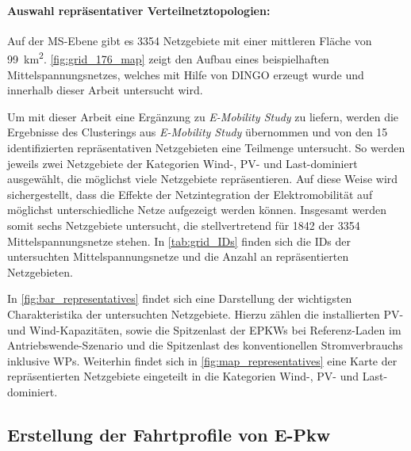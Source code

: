 \paragraph{Auswahl repräsentativer Verteilnetztopologien:}

Auf der \gls{MS}-Ebene gibt es \num{3354} Netzgebiete mit einer mittleren Fläche von \SI{99}{\km\squared}.
\autoref{fig:grid_176_map} zeigt den Aufbau eines beispielhaften Mittelspannungsnetzes, welches mit Hilfe von \gls{DINGO} erzeugt wurde und innerhalb dieser Arbeit untersucht wird.



Um mit dieser Arbeit eine Ergänzung zu \textit{E-Mobility Study} \cite{Schachler} zu liefern, werden die Ergebnisse des Clusterings aus \textit{E-Mobility Study} \cite{Schachler} übernommen und von den \num{15} identifizierten repräsentativen Netzgebieten eine Teilmenge untersucht.
So werden jeweils zwei Netzgebiete der Kategorien Wind-, \gls{PV}- und Last-dominiert ausgewählt, die möglichst viele Netzgebiete repräsentieren.
Auf diese Weise wird sichergestellt, dass die Effekte der Netzintegration der Elektromobilität auf möglichst unterschiedliche Netze aufgezeigt werden können.
Insgesamt werden somit sechs Netzgebiete untersucht, die stellvertretend für \num{1842} der \num{3354} Mittelspannungsnetze stehen.
In \autoref{tab:grid_IDs} finden sich die \glspl{ID} der untersuchten Mittelspannungsnetze und die Anzahl an repräsentierten Netzgebieten.



In \autoref{fig:bar_representatives} findet sich eine Darstellung der wichtigsten Charakteristika der untersuchten Netzgebiete.
Hierzu zählen die installierten \gls{PV}- und Wind-Kapazitäten, sowie die Spitzenlast der \glspl{EPKW} bei Referenz-Laden im Antriebswende-Szenario und die Spitzenlast des konventionellen Stromverbrauchs inklusive \glspl{WP}.
Weiterhin findet sich in \autoref{fig:map_representatives} eine Karte der repräsentierten Netzgebiete eingeteilt in die Kategorien Wind-, \gls{PV}- und Last-dominiert.






\subsection{Erstellung der Fahrtprofile von E-Pkw}\label{chap:simbev_theo}

